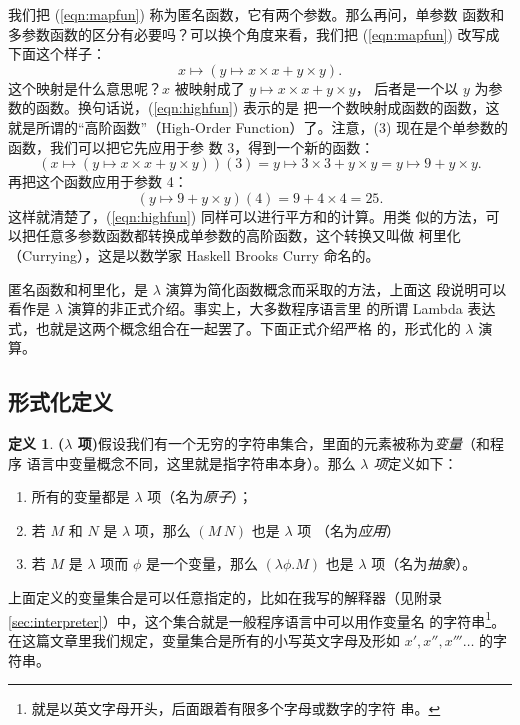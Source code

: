 \documentclass[a4paper,adobefonts]{ctexart}
\newenvironment{tightenum}{
  \begin{enumerate}
    \setlength{\itemsep}{0cm}
    \setlength{\parskip}{0cm}
    \setlength{\itemindent}{2\ccwd}
}{
  \end{enumerate}
}
\theoremstyle{definition}
\newtheorem{definition}{定义}
\begin{document}
我们把 (\ref{eqn:mapfun}) 称为匿名函数，它有两个参数。那么再问，单参数
函数和多参数函数的区分有必要吗？可以换个角度来看，我们把
(\ref{eqn:mapfun}) 改写成下面这个样子：
\begin{equation}\label{eqn:highfun}
x\mapsto(y\mapsto x\times x + y \times y).
\end{equation}
这个映射是什么意思呢？$x$ 被映射成了 $y\mapsto x\times x + y \times y$，
后者是一个以 $y$ 为参数的函数。换句话说，(\ref{eqn:highfun}) 表示的是
把一个数映射成函数的函数，这就是所谓的``高阶函数''（High-Order
  Function）了。注意，(3) 现在是个单参数的函数，我们可以把它先应用于参
数 3，得到一个新的函数：
$$
(x\mapsto(y\mapsto x\times x + y \times y))(3)
=y\mapsto 3\times 3 + y \times y = y\mapsto 9 + y \times y.
$$
再把这个函数应用于参数 4：
$$
(y\mapsto 9 + y \times y)(4)=9+4\times 4=25.
$$这样就清楚了，(\ref{eqn:highfun}) 同样可以进行平方和的计算。用类
似的方法，可以把任意多参数函数都转换成单参数的高阶函数，这个转换又叫做
柯里化（Currying），这是以数学家 Haskell Brooks Curry 命名的。

匿名函数和柯里化，是 $\lambda$ 演算为简化函数概念而采取的方法，上面这
段说明可以看作是 $\lambda$ 演算的非正式介绍。事实上，大多数程序语言里
的所谓 Lambda 表达式，也就是这两个概念组合在一起罢了。下面正式介绍严格
的，形式化的 $\lambda$ 演算。

\subsection{形式化定义}\label{subsec:formal}
\begin{definition}{\bfseries{($\lambda$ 项)}}\label{def:lambdaterm}
  假设我们有一个无穷的字符串集合，里面的元素被称为\emph{变量}（和程序
    语言中变量概念不同，这里就是指字符串本身）。那么 \emph{$\lambda$ 项}定义如下：
  \begin{tightenum}
  \item 所有的变量都是 $\lambda$ 项（名为\emph{原子}）；
  \item 若 $M$ 和 $N$ 是 $\lambda$ 项，那么 $(M\,N)$ 也是 $\lambda$ 项
    （名为\emph{应用}）
  \item 若 $M$ 是 $\lambda$ 项而 $\phi$ 是一个变量，那么 $(\lambda\phi.M)$
    也是 $\lambda$ 项（名为\emph{抽象}）。
  \end{tightenum}
\end{definition}

上面定义的变量集合是可以任意指定的，比如在我写的解释器（见附录
  \ref{sec:interpreter}）中，这个集合就是一般程序语言中可以用作变量名
的字符串\footnote{就是以英文字母开头，后面跟着有限多个字母或数字的字符
  串。}。在这篇文章里我们规定，变量集合是所有的小写英文字母及形如
$x',x'',x'''\dots$ 的字符串。
\end{document}
